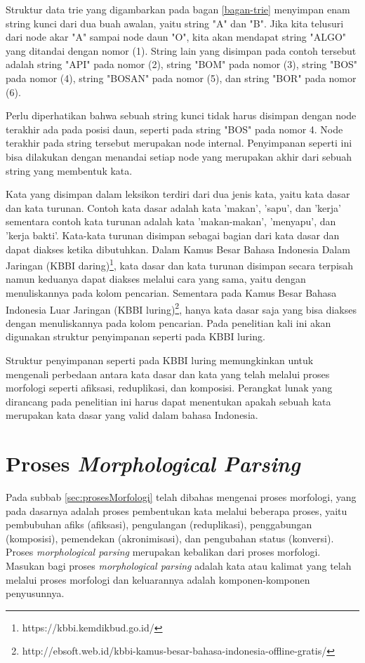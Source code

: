 Struktur data trie yang digambarkan pada bagan \ref{bagan-trie} menyimpan enam string kunci dari dua buah awalan, yaitu string "A" dan "B". Jika kita telusuri dari node akar "A" sampai node daun "O", kita akan mendapat string "ALGO" yang ditandai dengan nomor (1). String lain yang disimpan pada contoh tersebut adalah string "API" pada nomor (2), string "BOM" pada nomor (3), string "BOS" pada nomor (4), string "BOSAN" pada nomor (5), dan string "BOR" pada nomor (6).

Perlu diperhatikan bahwa sebuah string kunci tidak harus disimpan dengan node terakhir ada pada posisi daun, seperti pada string "BOS" pada nomor 4. Node terakhir pada string tersebut merupakan node internal. Penyimpanan seperti ini bisa dilakukan dengan menandai setiap node yang merupakan akhir dari sebuah string yang membentuk kata.

Kata yang disimpan dalam leksikon terdiri dari dua jenis kata, yaitu kata dasar dan kata turunan. Contoh kata dasar adalah kata 'makan', 'sapu', dan 'kerja' sementara contoh kata turunan adalah kata 'makan-makan', 'menyapu', dan 'kerja bakti'. Kata-kata turunan disimpan sebagai bagian dari kata dasar dan dapat diakses ketika dibutuhkan. Dalam Kamus Besar Bahasa Indonesia Dalam Jaringan (KBBI daring)\footnote{https://kbbi.kemdikbud.go.id/}, kata dasar dan kata turunan disimpan secara terpisah namun keduanya dapat diakses melalui cara yang sama, yaitu dengan menuliskannya pada kolom pencarian. Sementara pada Kamus Besar Bahasa Indonesia Luar Jaringan (KBBI luring)\footnote{http://ebsoft.web.id/kbbi-kamus-besar-bahasa-indonesia-offline-gratis/}, hanya kata dasar saja yang bisa diakses dengan menuliskannya pada kolom pencarian. Pada penelitian kali ini akan digunakan struktur penyimpanan seperti pada KBBI luring.

Struktur penyimpanan seperti pada KBBI luring memungkinkan untuk mengenali perbedaan antara kata dasar dan kata yang telah melalui proses morfologi seperti afiksasi, reduplikasi, dan komposisi. Perangkat lunak yang dirancang pada penelitian ini harus dapat menentukan apakah sebuah kata merupakan kata dasar yang valid dalam bahasa Indonesia.


\section{Proses \textit{Morphological Parsing}}
\label{sec:morphologicalParsing}

Pada subbab \ref{sec:prosesMorfologi} telah dibahas mengenai proses morfologi, yang pada dasarnya adalah proses pembentukan kata melalui beberapa proses, yaitu pembubuhan afiks (afiksasi), pengulangan (reduplikasi), penggabungan (komposisi), pemendekan (akronimisasi), dan pengubahan status (konversi). Proses \textit{morphological parsing} merupakan kebalikan dari proses morfologi. Masukan bagi proses \textit{morphological parsing} adalah kata atau kalimat yang telah melalui proses morfologi dan keluarannya adalah komponen-komponen penyusunnya.

